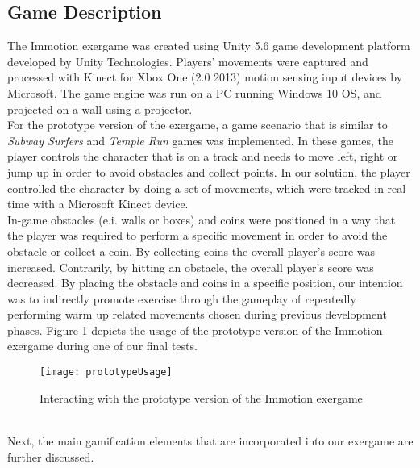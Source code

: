 \subsection{Game Description}
The Immotion exergame was created using Unity 5.6 game development platform developed by Unity Technologies. Players' movements were captured and processed with Kinect for Xbox One (2.0 2013) motion sensing input devices by Microsoft. The game engine was run on a PC running Windows 10 OS,  and projected on a wall using a projector.\\ %
For the prototype version of the exergame, a game scenario that is similar to \textit{Subway Surfers} and \textit{Temple Run} games was implemented. In these games, the player controls the character that is on a track and needs to move left, right or jump up in order to avoid obstacles and collect points. In our solution, the player controlled the character by doing a set of movements, which were tracked in real time with a Microsoft Kinect device. \\In-game obstacles (e.i. walls or boxes) and coins were positioned in a way that the player was required to perform a specific movement in order to avoid the obstacle or collect a coin. By collecting coins the overall player's score was increased. Contrarily, by hitting an obstacle, the overall player's score was decreased. By placing the obstacle and coins in a specific position, our intention was to indirectly promote exercise through the gameplay of repeatedly performing warm up related movements chosen during previous development phases. Figure \ref{fig:prototypeUsage} depicts the usage of the prototype version of the Immotion exergame during one of our final tests.\\
\begin{figure}[h]
    \centering
    \texttt{[image: prototypeUsage]}
    \caption{Interacting with the prototype version of the Immotion exergame}
    \label{fig:prototypeUsage}
\end{figure}\\
Next, the main gamification elements that are incorporated into our exergame are further discussed.
